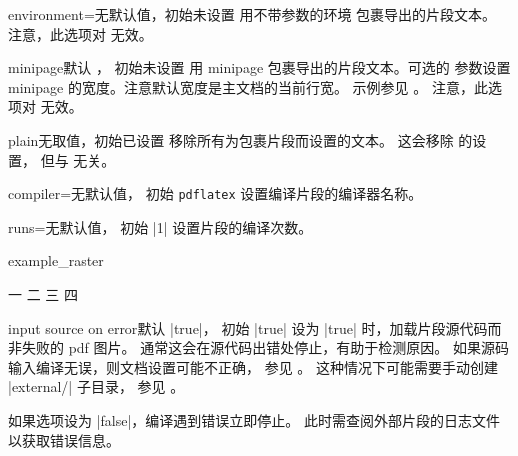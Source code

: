 \begin{extTcbKey}[][doc new=2015-03-11]{environment}{=}{无默认值，初始未设置}
用不带参数的环境  包裹导出的片段文本。
注意，此选项对  无效。
\end{extTcbKey}



\begin{extTcbKey}[][doc new=2015-03-11]{minipage}{}{默认 \texttt{}，
  初始未设置}
用 minipage 包裹导出的片段文本。可选的 
参数设置 minipage 的宽度。注意默认宽度是主文档的当前行宽。
示例参见 。
注意，此选项对  无效。
\end{extTcbKey}


\begin{extTcbKey}[][doc new=2015-03-11]{plain}{}{无取值，初始已设置}
移除所有为包裹片段而设置的文本。
这会移除  的设置，
但与  无关。
\end{extTcbKey}


\begin{extTcbKey}[][doc new=2015-03-11]{compiler}{=}{无默认值，
  初始 \texttt{pdflatex}}
设置编译片段的编译器名称。
\end{extTcbKey}

\begin{extTcbKey}[][doc new=2015-03-11]{runs}{=}{无默认值，
  初始 |1|}
设置片段的编译次数。
\begin{dispExample}
\begin{tcbexternal}[minipage,runs=2]{example_raster}
  \begin{tcbitemize}[raster equal height,
      size=small,colframe=red!50!black,colback=red!10!white]
    \tcbitem 一
    \tcbitem \Huge 二
    \tcbitem 三
    \tcbitem 四
  \end{tcbitemize}
\end{tcbexternal}
\end{dispExample}
\end{extTcbKey}

\enlargethispage*{1cm}
\begin{extTcbKey}[][doc new=2015-03-11]{input source on error}{}{默认 |true|，
  初始 |true|}
设为 |true| 时，加载片段源代码而非失败的 pdf 图片。
通常这会在源代码出错处停止，有助于检测原因。
如果源码输入编译无误，则文档设置可能不正确，
参见 。
这种情况下可能需要手动创建 |external/| 子目录，
参见 。\par
如果选项设为 |false|，编译遇到错误立即停止。
此时需查阅外部片段的日志文件以获取错误信息。
\end{extTcbKey}


